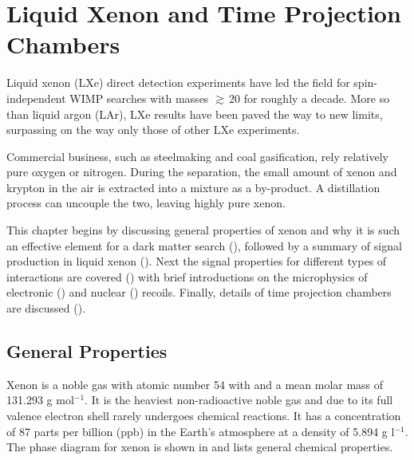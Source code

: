 

\pagestyle{cu}
\graphicspath{{./Chapter2/Figures/}}
\chapter[Liquid Xenon and Time Projection Chambers][Liquid Xenon and Time Projection Chambers]{Liquid Xenon and Time Projection Chambers}
\label{chap:liquid_xe}

Liquid xenon (LXe) direct detection experiments have led the field for spin-independent WIMP searches with masses ${\gtrsim}\, 20$ for
roughly a decade.  More so than liquid argon (LAr), LXe results have been paved the way to new limits, surpassing on the way only those of
other
LXe experiments.

Commercial business, such as steelmaking and coal gasification, rely relatively pure oxygen or nitrogen.  During the separation,
the small amount of xenon and krypton in the air is extracted into a mixture as a by-product.  A distillation process can uncouple
the two, leaving highly pure xenon.

This chapter begins by discussing general properties of xenon and why it is such an effective element for a dark matter search
(), followed by a summary of signal production in liquid xenon ().  Next the signal
properties for different types of interactions are covered () with brief introductions on the microphysics of
electronic () and nuclear () recoils.  Finally, details of time projection chambers are discussed
().

\section{General Properties}
\label{sec:properties}
Xenon is a noble gas with atomic number 54 with and a mean molar mass of 131.293 g mol$^{-1}$.  It is the heaviest non-radioactive noble
gas and due to its full valence electron
shell rarely undergoes chemical reactions.  It has a concentration of 87 parts per billion (ppb)
in the Earth's atmosphere at a density of
5.894 g l$^{-1}$.  The phase diagram for xenon is shown in  and  lists general
chemical properties.

